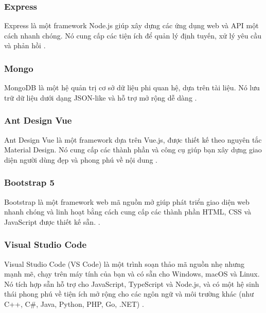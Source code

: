\subsubsection{Express}

Express là một framework Node.js giúp xây dựng các ứng dụng web và API một cách nhanh chóng.
Nó cung cấp các tiện ích để quản lý định tuyến, xử lý yêu cầu và phản hồi \cite{express}.

\subsubsection{Mongo}

MongoDB là một hệ quản trị cơ sở dữ liệu phi quan hệ, dựa trên tài liệu.
Nó lưu trữ dữ liệu dưới dạng JSON-like và hỗ trợ mở rộng dễ dàng \cite{mongodb}.

\subsubsection{Ant Design Vue}

Ant Design Vue là một framework dựa trên Vue.js, được thiết kế theo nguyên tắc Material Design.
Nó cung cấp các thành phần và công cụ giúp bạn xây dựng giao diện người dùng đẹp và phong phú về nội dung \cite{antdesignvue}.
\subsubsection{Bootstrap 5}


Bootstrap là một framework web mã nguồn mở giúp phát triển giao diện web nhanh chóng và linh hoạt bằng cách cung cấp các thành phần HTML, CSS và JavaScript được thiết kế sẵn. \cite{bootstrap}.

\subsubsection{Visual Studio Code}

Visual Studio Code (VS Code) là một trình soạn thảo mã nguồn nhẹ nhưng mạnh mẽ, chạy trên máy tính của bạn và có sẵn cho Windows, macOS và Linux.
Nó tích hợp sẵn hỗ trợ cho JavaScript, TypeScript và Node.js, và có một hệ sinh thái phong phú về tiện ích mở rộng cho các ngôn ngữ và môi trường khác (như C++, C\#, Java, Python, PHP, Go, .NET) \cite{vscode}.




